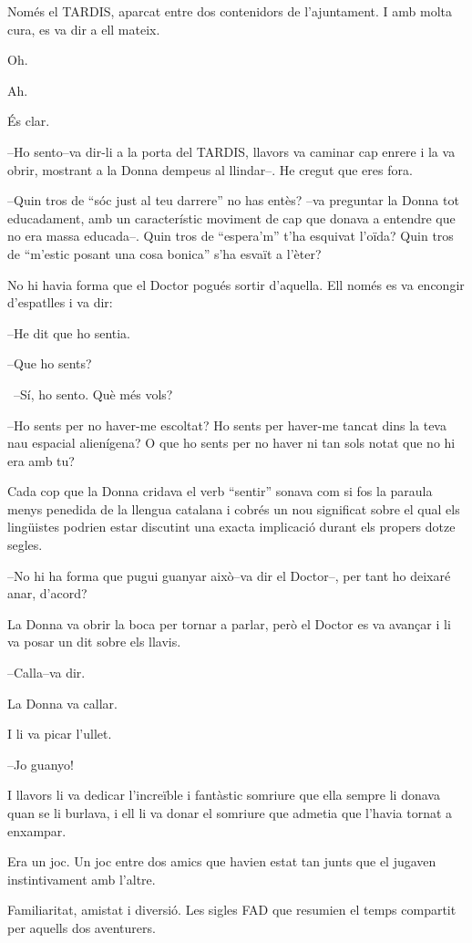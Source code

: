 Només el TARDIS, aparcat entre dos contenidors de l'ajuntament. I amb
molta cura, es va dir a ell mateix.

Oh.

Ah.

És clar.

--Ho sento--va dir-li a la porta del TARDIS, llavors va caminar cap
enrere i la va obrir, mostrant a la Donna dempeus al llindar--. He
cregut que eres fora.

--Quin tros de ``sóc just al teu darrere'' no has entès? --va preguntar
la Donna tot educadament, amb un característic moviment de cap que
donava a entendre que no era massa educada--. Quin tros de ``espera'm''
t'ha esquivat l'oïda? Quin tros de ``m'estic posant una cosa bonica''
s'ha esvaït a l'èter?

No hi havia forma que el Doctor pogués sortir d'aquella. Ell només es va
encongir d'espatlles i va dir:

--He dit que ho sentia.

--Que ho sents?

~--Sí, ho sento. Què més vols?

--Ho sents per no haver-me escoltat? Ho sents per haver-me tancat dins
la teva nau espacial alienígena? O que ho sents per no haver ni tan sols
notat que no hi era amb tu?

Cada cop que la Donna cridava el verb ``sentir'' sonava com si fos la
paraula menys penedida de la llengua catalana i cobrés un nou significat
sobre el qual els lingüistes podrien estar discutint una exacta
implicació durant els propers dotze segles.

--No hi ha forma que pugui guanyar això--va dir el Doctor--, per tant ho
deixaré anar, d'acord?

La Donna va obrir la boca per tornar a parlar, però el Doctor es va
avançar i li va posar un dit sobre els llavis.

--Calla--va dir.

La Donna va callar.

I li va picar l'ullet.

--Jo guanyo!

I llavors li va dedicar l'increïble i fantàstic somriure que ella sempre
li donava quan se li burlava, i ell li va donar el somriure que admetia
que l'havia tornat a enxampar.

Era un joc. Un joc entre dos amics que havien estat tan junts que el
jugaven instintivament amb l'altre.

Familiaritat, amistat i diversió. Les sigles FAD que resumien el temps
compartit per aquells dos aventurers.

